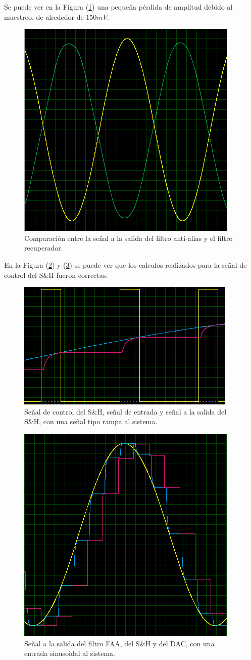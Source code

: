 Se puede ver en la Figura (\ref{result2}) una pequeña pérdida de amplitud debido al muestreo, de alrededor de $150mV$.

\begin{figure}[H]
\centering
\includegraphics[width=0.5\linewidth, page=1]{ImagenesEjercicio1/result2.png}
\caption{Comparación entre la señal a la salida del filtro anti-alias y el filtro recuperador.}
\label{result2}
\end{figure}

En la Figura (\ref{sh}) y (\ref{sh2}) se puede ver que los calculos realizados para la señal de control del S\&H fueron correctas.

\begin{figure}[H]
\centering
\includegraphics[width=0.8\linewidth, page=1]{ImagenesEjercicio1/S_H.png}
\caption{Señal de control del S\&H, señal de entrada y señal a la salida del S\&H, con una señal tipo rampa al sistema.}
\label{sh}
\end{figure}

\begin{figure}[H]
\centering
\includegraphics[width=0.5\linewidth, page=1]{ImagenesEjercicio1/result3.png}
\caption{Señal a la salida del filtro FAA, del S\&H y del DAC, con una entrada sinusoidal al sistema.}
\label{sh2}
\end{figure}

